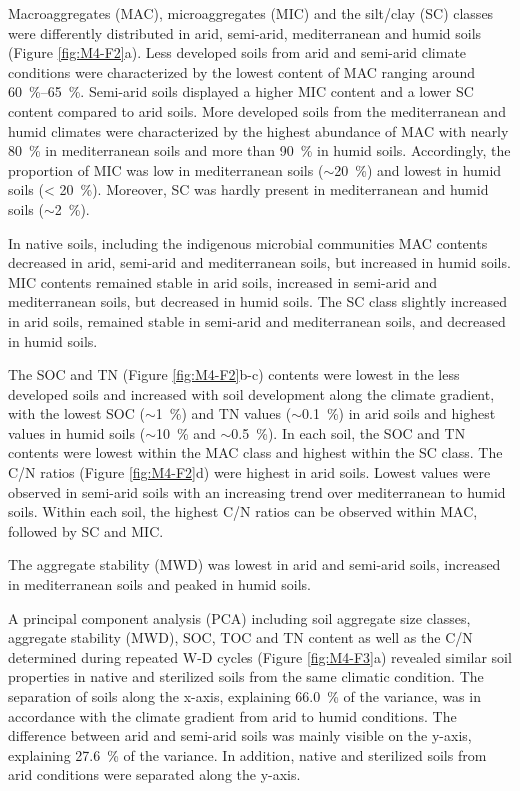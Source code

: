 Macroaggregates (MAC), microaggregates (MIC) and the silt/clay (SC) classes were differently distributed in arid, semi-arid, mediterranean and humid soils (Figure \ref{fig:M4-F2}a). Less developed soils from arid and semi-arid climate conditions were characterized by the lowest content of MAC ranging around \SIrange{60}{65}{\percent}. Semi-arid soils displayed a higher MIC content and a lower SC content compared to arid soils. More developed soils from the mediterranean and humid climates were characterized by the highest abundance of MAC with nearly \SI{80}{\percent} in mediterranean soils and more than \SI{90}{\percent} in humid soils. Accordingly, the proportion of MIC was low in mediterranean soils (\(\sim\)\SI{20}{\percent}) and lowest in humid soils (\SI{< 20}{\percent}). Moreover, SC was hardly present in mediterranean and humid soils (\(\sim\)\SI{2}{\percent}).

In native soils, including the indigenous microbial communities MAC contents decreased in arid, semi-arid and mediterranean soils, but increased in humid soils. 
MIC contents remained stable in arid soils, increased in semi-arid and mediterranean soils, but decreased in humid soils. 
The SC class slightly increased in arid soils, remained stable in semi-arid and mediterranean soils, and decreased in humid soils.

The SOC and TN (Figure \ref{fig:M4-F2}b-c) contents were lowest in the less developed soils and increased with soil development along the climate gradient, with the lowest SOC (\(\sim\)\SI{1}{\percent}) and TN values (\(\sim\)\SI{0.1}{\percent}) in arid soils and highest values in humid soils (\(\sim\)\SI{10}{\percent} and \(\sim\)\SI{0.5}{\percent}). In each soil, the SOC and TN contents were lowest within the MAC class and highest within the SC class. The C/N ratios (Figure \ref{fig:M4-F2}d) were highest in arid soils. Lowest values were observed in semi-arid soils with an increasing trend over mediterranean to humid soils. Within each soil, the highest C/N ratios can be observed within MAC, followed by SC and MIC.

The aggregate stability (MWD) was lowest in arid and semi-arid soils, increased in mediterranean soils and peaked in humid soils.

A principal component analysis (PCA) including soil aggregate size classes, aggregate stability (MWD), SOC, TOC and TN content as well as the C/N determined during repeated W-D cycles (Figure \ref{fig:M4-F3}a) revealed similar soil properties in native and sterilized soils from the same climatic condition. The separation of soils along the x-axis, explaining \SI{66.0}{\percent} of the variance, was in accordance with the climate gradient from arid to humid conditions. The difference between arid and semi-arid soils was mainly visible on the y-axis, explaining \SI{27.6}{\percent} of the variance. In addition, native and sterilized soils from arid conditions were separated along the y-axis.

